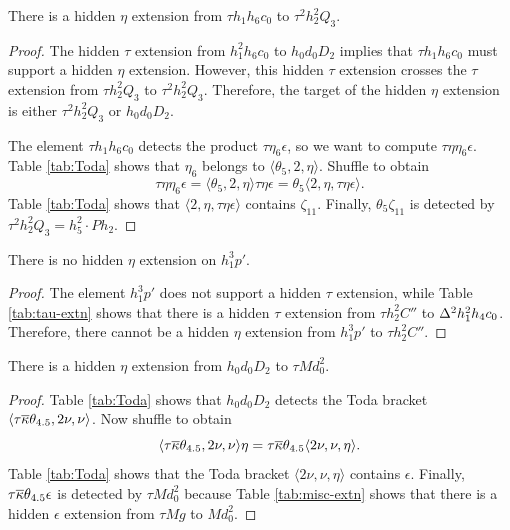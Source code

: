 \begin{lemma}
\label{lem:eta-th1h6c0}
There is a hidden $\eta$ extension from $\tau h_1 h_6 c_0$ 
to $\tau^2 h_2^2 Q_3$.
\end{lemma}

\begin{proof}
The hidden $\tau$ extension from $h_1^2 h_6 c_0$ to
$h_0 d_0 D_2$ implies that $\tau h_1 h_6 c_0$ must support a hidden
$\eta$ extension.  However, this hidden $\tau$ extension crosses
the $\tau$ extension from $\tau h_2^2 Q_3$ to $\tau^2 h_2^2 Q_3$.
Therefore, the target of the hidden $\eta$ extension is either
$\tau^2 h_2^2 Q_3$ or $h_0 d_0 D_2$.

The element $\tau h_1 h_6 c_0$ detects the product 
$\tau \eta_6 \epsilon$, so we want to compute 
$\tau \eta \eta_6 \epsilon$.
Table \ref{tab:Toda} shows that 
$\eta_6$ belongs to $\langle \theta_5, 2, \eta \rangle$.
Shuffle to obtain
\[
\tau \eta \eta_6 \epsilon = 
\langle \theta_5, 2, \eta \rangle \tau \eta \epsilon =
\theta_5 \langle 2, \eta, \tau \eta \epsilon \rangle.
\]
Table \ref{tab:Toda} shows that
$\langle 2, \eta, \tau \eta \epsilon \rangle$
contains $\zeta_{11}$.
Finally, $\theta_5 \zeta_{11}$ is detected by
$\tau^2 h_2^2 Q_3 = h_5^2 \cdot P h_2$.
\end{proof}

\begin{lemma}
\label{lem:eta-h1^3p'}
There is no hidden $\eta$ extension on $h_1^3 p'$.
\end{lemma}

\begin{proof}
The element $h_1^3 p'$ does not support a hidden $\tau$ extension,
while Table \ref{tab:tau-extn} shows that
there is a hidden $\tau$ extension from $\tau h_2^2 C''$ to
$\Delta^2 h_1^2 h_4 c_0$.  Therefore, there cannot be a hidden
$\eta$ extension from $h_1^3 p'$ to $\tau h_2^2 C''$.
\end{proof}

\begin{lemma}
\label{lem:eta-h0d0D2}
There is a hidden $\eta$ extension from $h_0 d_0 D_2$ to
$\tau M d_0^2$.
\end{lemma}

\begin{proof}
Table \ref{tab:Toda} shows that $h_0 d_0 D_2$ detects the
Toda bracket $\langle \tau \overline{\kappa} \theta_{4.5}, 2 \nu, \nu \rangle$.
Now shuffle to obtain
\[
\langle \tau \overline{\kappa} \theta_{4.5}, 2 \nu, \nu \rangle \eta =
\tau \overline{\kappa} \theta_{4.5} \langle 2 \nu, \nu, \eta \rangle.
\]
Table \ref{tab:Toda} shows that 
the Toda bracket $\langle 2 \nu, \nu, \eta \rangle$
contains $\epsilon$.
Finally, $\tau \overline{\kappa} \theta_{4.5} \epsilon$
is detected by $\tau M d_0^2$ because
Table \ref{tab:misc-extn} shows that there 
is a hidden $\epsilon$ extension from
$\tau M g$ to $M d_0^2$.
\end{proof}

